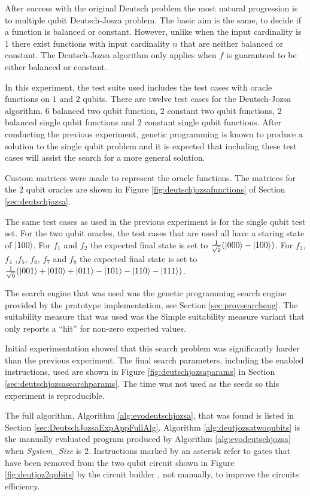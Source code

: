 After success with the original Deutsch problem the most natural progression is to multiple qubit Deutsch-Josza problem.
The basic aim is the same, to decide if a function is balanced or constant.
However, unlike when the input cardinality is $1$ there exist functions with input cardinality $n$ that are neither balanced or constant.
The Deutsch-Jozsa algorithm only applies when $f$ is guaranteed to be either balanced or constant.

In this experiment, the test suite used includes the test cases with oracle functions on $1$ and $2$ qubits.
There are twelve test cases for the Deutsch-Jozsa algorithm.
$6$ balanced two qubit function, $2$ constant two qubit functions, $2$ balanced single qubit functions and $2$ constant single qubit functions.
After conducting the previous experiment, genetic programming is known to produce a solution to the single qubit problem and it is expected that including these test cases will assist the search for a more general solution.

Custom matrices were made to represent the oracle functions.
The matrices for the $2$ qubit oracles are shown in Figure \ref{fig:deutschjozsafunctions} of Section \ref{sec:deutschjozsa}.

The same test cases as used in the previous experiment is for the single qubit test set.
For the two qubit oracles, the test cases that are used all have a staring state of $\left\vert{100}\right\rangle$.
For $f_1$ and $f_2$ the expected final state is set to $\frac{1}{\sqrt{2}}(\left\vert{000}\right\rangle-\left\vert{100}\right\rangle)$.
For $f_3$, $f_4$ ,$f_5$, $f_6$, $f_7$ and $f_8$ the expected final state is set to $\frac{1}{\sqrt{6}}(\left\vert{001}\right\rangle+\left\vert{010}\right\rangle+\left\vert{011}\right\rangle-\left\vert{101}\right\rangle-\left\vert{110}\right\rangle-\left\vert{111}\right\rangle)$.

The search engine that was used was the genetic programming search engine provided by the prototype implementation, see Section \ref{sec:provsearcheng}.
The suitability measure that was used was the Simple suitability measure variant that only reports a ``hit'' for non-zero expected values.

Initial experimentation showed that this search problem was significantly harder than the previous experiment.
The final search parameters, including the enabled instructions, used are shown in Figure \ref{fig:deutschjozsaparams} in Section \ref{sec:deutschjozsasearchparams}.
The time was not used as the seeds so this experiment is reproducible.

The full algorithm, Algorithm \ref{alg:evodeutschjozsa}, that was found is listed in Section \ref{sec:DeutschJozsaExpAppFullAlg}.
Algorithm \ref{alg:deutjozsatwoqubits} is the manually evaluated program produced by Algorithm \ref{alg:evodeutschjozsa} when \emph{System\_Size} is $2$.
Instructions marked by an asterisk refer to gates that have been removed from the two qubit circuit shown in Figure \ref{fig:deutjoz2qubits} by the circuit builder , not manually, to improve the circuits efficiency.

